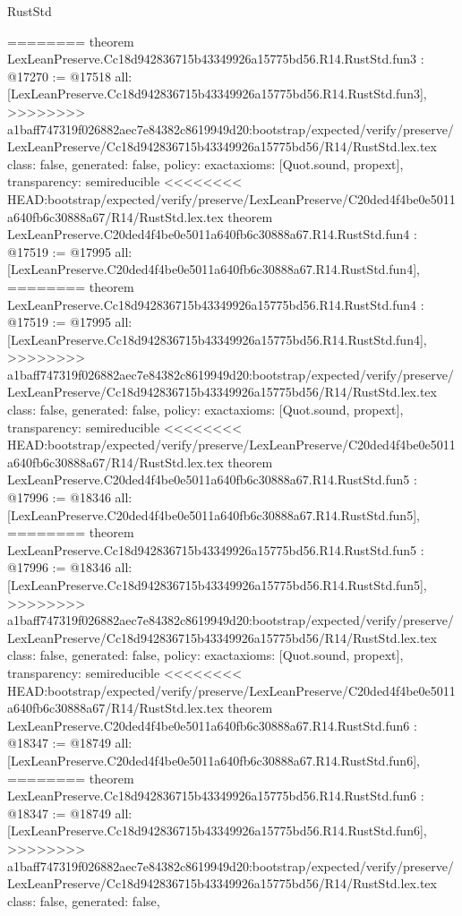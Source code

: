 \begin{lexlean}{RustStd}
\begin{coremodule}
{\begin{coremodule}
{{{{{{========
theorem LexLeanPreserve.Cc18d942836715b43349926a15775bd56.R14.RustStd.fun3 : @17270 := @17518 {
  all: [LexLeanPreserve.Cc18d942836715b43349926a15775bd56.R14.RustStd.fun3],
>>>>>>>> a1baff747319f026882aec7e84382c8619949d20:bootstrap/expected/verify/preserve/LexLeanPreserve/Cc18d942836715b43349926a15775bd56/R14/RustStd.lex.tex
  class: false,
  generated: false,
  policy: exact{axioms: [Quot.sound, propext]},
  transparency: semireducible
}
<<<<<<<< HEAD:bootstrap/expected/verify/preserve/LexLeanPreserve/C20ded4f4be0e5011a640fb6c30888a67/R14/RustStd.lex.tex
theorem LexLeanPreserve.C20ded4f4be0e5011a640fb6c30888a67.R14.RustStd.fun4 : @17519 := @17995 {
  all: [LexLeanPreserve.C20ded4f4be0e5011a640fb6c30888a67.R14.RustStd.fun4],
========
theorem LexLeanPreserve.Cc18d942836715b43349926a15775bd56.R14.RustStd.fun4 : @17519 := @17995 {
  all: [LexLeanPreserve.Cc18d942836715b43349926a15775bd56.R14.RustStd.fun4],
>>>>>>>> a1baff747319f026882aec7e84382c8619949d20:bootstrap/expected/verify/preserve/LexLeanPreserve/Cc18d942836715b43349926a15775bd56/R14/RustStd.lex.tex
  class: false,
  generated: false,
  policy: exact{axioms: [Quot.sound, propext]},
  transparency: semireducible
}
<<<<<<<< HEAD:bootstrap/expected/verify/preserve/LexLeanPreserve/C20ded4f4be0e5011a640fb6c30888a67/R14/RustStd.lex.tex
theorem LexLeanPreserve.C20ded4f4be0e5011a640fb6c30888a67.R14.RustStd.fun5 : @17996 := @18346 {
  all: [LexLeanPreserve.C20ded4f4be0e5011a640fb6c30888a67.R14.RustStd.fun5],
========
theorem LexLeanPreserve.Cc18d942836715b43349926a15775bd56.R14.RustStd.fun5 : @17996 := @18346 {
  all: [LexLeanPreserve.Cc18d942836715b43349926a15775bd56.R14.RustStd.fun5],
>>>>>>>> a1baff747319f026882aec7e84382c8619949d20:bootstrap/expected/verify/preserve/LexLeanPreserve/Cc18d942836715b43349926a15775bd56/R14/RustStd.lex.tex
  class: false,
  generated: false,
  policy: exact{axioms: [Quot.sound, propext]},
  transparency: semireducible
}
<<<<<<<< HEAD:bootstrap/expected/verify/preserve/LexLeanPreserve/C20ded4f4be0e5011a640fb6c30888a67/R14/RustStd.lex.tex
theorem LexLeanPreserve.C20ded4f4be0e5011a640fb6c30888a67.R14.RustStd.fun6 : @18347 := @18749 {
  all: [LexLeanPreserve.C20ded4f4be0e5011a640fb6c30888a67.R14.RustStd.fun6],
========
theorem LexLeanPreserve.Cc18d942836715b43349926a15775bd56.R14.RustStd.fun6 : @18347 := @18749 {
  all: [LexLeanPreserve.Cc18d942836715b43349926a15775bd56.R14.RustStd.fun6],
>>>>>>>> a1baff747319f026882aec7e84382c8619949d20:bootstrap/expected/verify/preserve/LexLeanPreserve/Cc18d942836715b43349926a15775bd56/R14/RustStd.lex.tex
  class: false,
  generated: false,
}}}}}}}}}}
\end{coremodule}}
\end{coremodule}
\end{lexlean}

